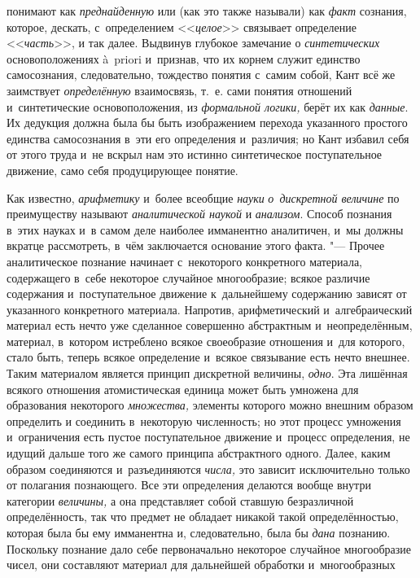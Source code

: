 понимают как {\em преднайденную}
или (как это также называли) как
{\em факт} сознания,
которое, дескать, с~определением
<<{\em целое}>> связывает
определение <<{\em часть}>>,
и так далее. Выдвинув глубокое замечание о
{\em синтетических}
основоположениях à~priori и~признав, что их корнем служит
единство самосознания, следовательно, тождество понятия с~самим собой, Кант
всё же заимствует {\em определённую}
взаимосвязь, т.~е. сами понятия отношений и~синтетические
основоположения, из {\em формальной
логики,} берёт их как
{\em данные}. Их дедукция
должна была бы быть изображением перехода указанного простого единства
самосознания в~эти его определения и~различия; но Кант избавил себя от
этого труда и~не вскрыл нам это истинно синтетическое поступательное
движение, само себя продуцирующее понятие.

Как известно,
{\em арифметику} и~более
всеобщие {\em науки}
{\em о~дискретной величине}
по преимуществу называют
{\em аналитической наукой}
и {\em анализом}.
Способ познания в~этих науках и~в самом деле наиболее
имманентно аналитичен, и~мы должны вкратце рассмотреть, в~чём заключается
основание этого факта. "--- Прочее аналитическое познание
начинает с~некоторого конкретного материала, содержащего в~себе некоторое
случайное многообразие; всякое различие содержания и~поступательное
движение к~дальнейшему содержанию зависят от указанного конкретного
материала. Напротив, арифметический и~алгебраический материал есть нечто
уже сделанное совершенно абстрактным и~неопределённым, материал, в~котором
истреблено всякое своеобразие отношения и~для которого, стало быть, теперь
всякое определение и~всякое связывание есть нечто внешнее. Таким
материалом является принцип дискретной величины,
{\em одно}. Эта лишённая
всякого отношения атомистическая единица может быть умножена для
образования некоторого {\em множества,}
элементы которого можно внешним образом определить и
соединить в~некоторую численность; но этот процесс умножения и~ограничения
есть пустое поступательное движение и~процесс определения, не идущий дальше
того же самого принципа абстрактного одного. Далее, каким образом
соединяются и~разъединяются
{\em числа,} это зависит
исключительно только от полагания познающего. Все эти определения делаются
вообще внутри категории {\em величины,}
а она представляет собой ставшую безразличной определённость,
так что предмет не обладает никакой такой определённостью, которая была бы
ему имманентна и, следовательно, была бы
{\em дана} познанию.
Поскольку познание дало себе первоначально некоторое случайное многообразие
чисел, они составляют материал для дальнейшей обработки и~многообразных
